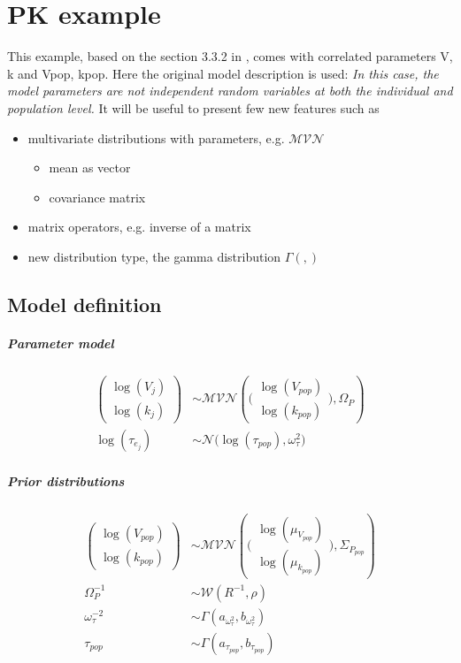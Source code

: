 \section{PK example}

This example, based on the section 3.3.2 in \cite{Chiudinelli2015}, comes with correlated
parameters V, k and Vpop, kpop. Here the original model description is used: 
\emph{In this case, the model parameters are not independent random variables 
at both the individual and population level.} It will be useful to present few new 
features such as
\begin{itemize}
\item 
multivariate distributions with parameters, e.g. $\mathcal {MVN}$
\begin{itemize}
\item 
mean as vector
\item 
covariance matrix 
\end{itemize}
\item 
matrix operators, e.g. inverse of a matrix
\item 
new distribution type, the gamma distribution $\Gamma (,)$
\end{itemize}

\subsection{Model definition}

\subparagraph{Parameter model}
\begin{align*}
\left(\begin{array}{c} \log(V_j) \\
\log(k_j) \end{array}\right) & \sim
\mathcal {MVN} \left( \Big(\begin{array}{c} \log(V_{pop}) \\ \log(k_{pop}) \end{array}\Big),\Omega_P \right)\\
\log(\tau_{e_j}) &\sim \mathcal N \big(\log(\tau_{pop}),\omega_{\tau}^2\big)
\end{align*}

\subparagraph{Prior distributions}
\begin{align*}
\left(\begin{array}{c} \log(V_{pop}) \\
\log(k_{pop}) \end{array}\right) & \sim
\mathcal {MVN} \left( \Big(\begin{array}{c} \log(\mu_{V_{pop}}) \\ \log(\mu_{k_{pop}}) \end{array}\Big),\Sigma_{P_{pop}} \right)\\
\Omega_P^{-1} &\sim \mathcal {W} (R^{-1},\rho)\\
\omega_{\tau}^{-2} &\sim \Gamma (a_{\omega_{\tau}^2},b_{\omega_{\tau}^2})\\
\tau_{pop} &\sim \Gamma (a_{\tau_{pop}},b_{\tau_{pop}})
\end{align*}

